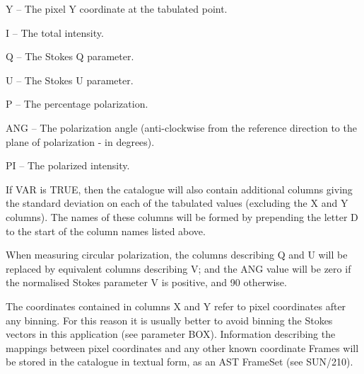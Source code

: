 \documentclass[twoside,11pt]{article}
\newcommand{\xref}[3]{#1}
\renewcommand{\_}{\texttt{\symbol{95}}}
\newcommand{\sstitem}{\item}
\newcommand{\sstitem}{\item}
\begin{document}
{{{{            \sstitem
               Y  -- The pixel Y coordinate at the tabulated point.

            \sstitem
               I  -- The total intensity.

            \sstitem
               Q  -- The Stokes Q parameter.

            \sstitem
               U  -- The Stokes U parameter.

            \sstitem
               P  -- The percentage polarization.

            \sstitem
               ANG  -- The polarization angle (anti-clockwise from the
               reference direction to the plane of polarization - in degrees).

            \sstitem
               PI -- The polarized intensity.

         }
         If VAR is TRUE, then the catalogue will also contain
         additional columns giving the standard deviation on each of the
         tabulated values (excluding the X and Y columns). The names of
         these columns will be formed by prepending the letter D to the
         start of the column names listed above.

         When measuring circular polarization, the columns describing Q
         and U will be replaced by equivalent columns describing V; and
         the ANG value will be zero if the normalised Stokes parameter V
         is positive, and 90 otherwise.

         The coordinates contained in columns X and Y refer to pixel
         coordinates after any binning. For this reason it is usually better
         to avoid binning the Stokes vectors in this application (see
         parameter BOX). Information describing the mappings between pixel
         coordinates and any other known coordinate Frames will be stored in
         the catalogue in textual form, as an AST FrameSet (see
         \xref{SUN/210}{sun210}{}).

}}}
\end{document}
